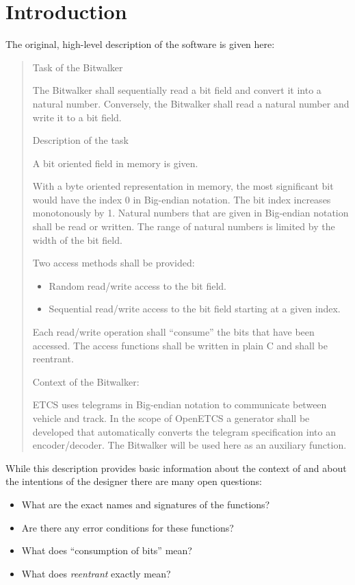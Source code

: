 
\section{Introduction}
\label{sec:introduction}

The original, high-level description of the \bitwalker software is given here:

\begin{quote}
 
Task of the Bitwalker
 
The Bitwalker shall sequentially read a bit field and convert it into a natural number.
Conversely, the Bitwalker shall read a natural number and write it to a bit field.
 
Description of the task
 
A bit oriented field in memory is given.

With a byte oriented representation in memory, the most significant bit
would have the index 0 in Big-endian notation.
The bit index increases monotonously by 1.
Natural numbers that are given in Big-endian notation shall be read or written.
The range of natural numbers is limited by the width of the bit field.

Two access methods shall be provided:
\begin{itemize}
\item  Random read/write access to the bit field. 
\item  Sequential read/write access to the bit field starting at a given index.
\end{itemize}

Each read/write operation shall ``consume'' the bits that have been accessed.
The access functions shall be written in plain C and shall be reentrant.
 
Context of the Bitwalker:
 
ETCS uses telegrams in Big-endian notation to communicate between vehicle and track.
In the scope of OpenETCS a generator shall be developed that
automatically converts the telegram specification into an encoder/decoder.
The Bitwalker will be used here as an auxiliary function.
\end{quote}

While this description provides basic information about the context
of \bitwalker and about the intentions of the designer there are 
many open questions:

\begin{itemize}
\item What are the exact names and signatures of the functions?
\item Are there any error conditions for these functions?
\item What does ``consumption of bits'' mean?
\item What does \emph{reentrant} exactly mean?
\end{itemize}


